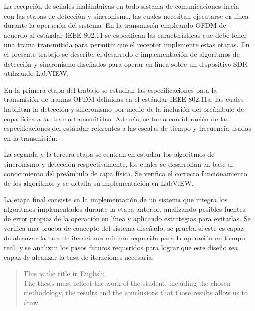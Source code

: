 \begin{resumen}%

La recepción de señales inalámbricas en todo sistema de comunicaciones inicia con las etapas de detección y sincronismo, las cuales necesitan ejecutarse en línea durante la operación del sistema. En la transmisión empleando OFDM de acuerdo al estándar IEEE 802.11 se especifican las características que debe tener una trama transmitida para permitir que el receptor implemente estas etapas. En el presente trabajo se describe el desarrollo e implementación de algoritmos de detección y sincronismo diseñados para operar en línea sobre un dispositivo SDR utilizando LabVIEW. 

En la primera etapa del trabajo se estudian las especificaciones para \color{Red}la transmisión de tramas OFDM definidas en el estándar IEEE 802.11a\color{black}, las cuales habilitan la detección y sincronismo por medio de la inclusión del preámbulo de capa física a las trama transmitidas. Además, se toma consideración de las especificaciones del estándar referentes a las escalas de tiempo y frecuencia usadas en la transmisión.

La segunda y la tercera etapa se centran en estudiar los algoritmos de sincronismo y detección respectivamente, los cuales se desarrollan en base al conocimiento del preámbulo de capa física. Se verifica el correcto funcionamiento de los algoritmos y \color{Red}se detalla su implementación en LabVIEW.\color{black}

La etapa final consiste en la implementación de un sistema que integra los algoritmos implementados durante la etapa anterior, analizando posibles fuentes de error propias de la operación en línea y aplicando estrategias para evitarlas. Se verifica una prueba de concepto del sistema diseñado, se prueba si este es capaz de alcanzar la tasa de iteraciones mínima requerida para la operación en tiempo real, y se analizan los pasos futuros requeridos para lograr que este diseño sea capaz de alcanzar la tasa de iteraciones necesaria.

\end{resumen}

\begin{abstract}%
This is the title in English:\\
The thesis must reflect the work of the student, including the chosen methodology, the results and the conclusions that those results allow us to draw.
\end{abstract}


